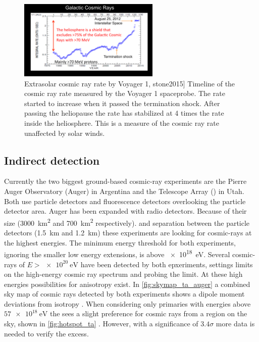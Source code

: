 \begin{figure}
    \centering
    \includegraphics[width=0.6\textwidth]
                    {plots/cosmic-rays/voyager_heliosphere}
    \caption{Extrasolar cosmic ray rate by Voyager 1, stone2015]
Timeline of the cosmic ray rate measured by the Voyager 1 spaceprobe. The rate started to increase when it passed the termination shock. After passing the heliopause the rate has stabilized at 4 times the rate inside the heliosphere. This is a measure of the cosmic ray rate unaffected by solar winds.}
    \label{fig:voyager_heliosphere}
\end{figure}


\subsection{Indirect detection}


Currently the two biggest ground-based cosmic-ray experiments are the Pierre Auger Observatory (Auger) \cite{abraham2004auger} in Argentina and the Telescope Array (\ta) \cite{abu-zayyad2012ta} in Utah. Both use particle detectors and fluorescence detectors overlooking the particle detector area. Auger has been expanded with radio detectors. Because of their size (\SI{3000}{\kilo\meter\squared} and \SI{700}{\kilo\meter\squared} respectively). and separation between the particle detectors (\SI{1.5}{\kilo\meter} and \SI{1.2}{\kilo\meter}) these experiments are looking for cosmic-rays at the highest energies. The minimum energy threshold for both experiments, ignoring the smaller low energy extensions, is above \SI{e18}{\eV}. Several cosmic-rays of $E > \SI{e20}{\eV}$ have been detected by both epxeriments, settings limits on the high-energy cosmic ray spectrum and probing the \gzk limit. At these high energies possibilities for anisotropy exist. In \cref{fig:skymap_ta_auger} a combined sky map of cosmic rays detected by both experiments shows a dipole moment deviations from isotropy \cite{abbasi2015combined}. When considering only primaries with energies above $\SI{57e18}{\eV}$ the \ta sees a slight preference for cosmic rays from a region on the sky, shown in \cref{fig:hotspot_ta} \cite{ta2014hotspot}. However, with a significance of $3.4 \sigma$ more data is needed to verify the excess.

